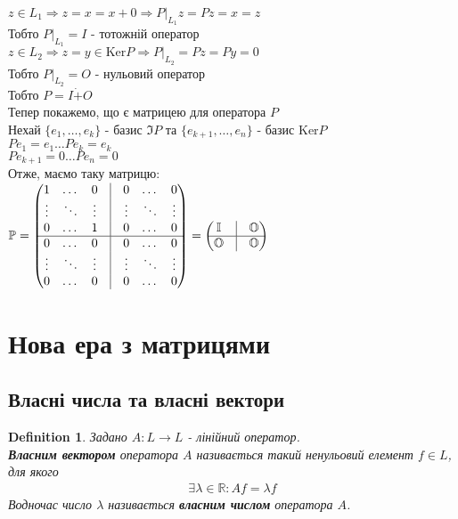 \documentclass[a4paper, 10pt]{article}
\def\ker#1{\textrm{Ker} {#1}}
\theoremstyle{theoremdd}
\theoremstyle{theoremdd}
\newtheorem{definition}[theorem]{Definition}
\theoremstyle{theoremdd}
\theoremstyle{theoremdd}
\theoremstyle{theoremdd}
\theoremstyle{theoremdd}
\theoremstyle{theoremdd}
\theoremstyle{theoremdd}
\begin{document}
$z \in L_1 \Rightarrow z = x = x+0 \Rightarrow P|_{L_1}z = Pz = x = z$\\
Тобто $P|_{L_1} = I$ - тотожній оператор\\
$z \in L_2 \Rightarrow z = y \in \ker P \Rightarrow P|_{L_2} = Pz = Py = 0$\\
Тобто $P|_{L_2} = O$ - нульовий оператор\\
Тобто $P = I \dot{+} O$
\bigskip \\
Тепер покажемо, що є матрицею для оператора $P$\\
Нехай $\{e_1,\dots,e_k\}$ - базис $\Im P$ та $\{e_{k+1},\dots,e_n\}$ - базис $\ker P$\\
$Pe_1 = e_1 \dots Pe_k = e_k$\\
$Pe_{k+1} = 0 \dots Pe_n = 0$\\
Отже, маємо таку матрицю:\\
$\mathbb{P} = \begin{pmatrix}
1 & \dots & 0 & \vline & 0 & \dots & 0 \\
\vdots & \ddots & \vdots & \vline & \vdots & \ddots & \vdots \\
0 & \dots & 1 & \vline & 0 & \dots & 0 \\
\hline
0 & \dots & 0 & \vline & 0 & \dots & 0 \\
\vdots & \ddots & \vdots & \vline & \vdots & \ddots & \vdots \\
0 & \dots & 0 & \vline & 0 & \dots & 0 \\
\end{pmatrix} = \begin{pmatrix}
\mathbb{I}  & \vline & \mathbb{O} \\
 \hline
\mathbb{O} & \vline & \mathbb{O}
\end{pmatrix}$
\fi

\newpage
\setcounter{section}{3}
\setcounter{subsection}{0}
\section{Нова ера з матрицями}
\subsection{Власні числа та власні вектори}
\begin{definition}
Задано $A: L \to L$ - лінійний оператор.\\
\textbf{Власним вектором} оператора $A$ називається такий ненульовий елемент $f \in L$, для якого
\begin{align*}
\exists \lambda \in \mathbb{R}: Af = \lambda f
\end{align*}
Водночас число $\lambda$ називається \textbf{власним числом} оператора $A$.
\end{definition}
\end{document}
